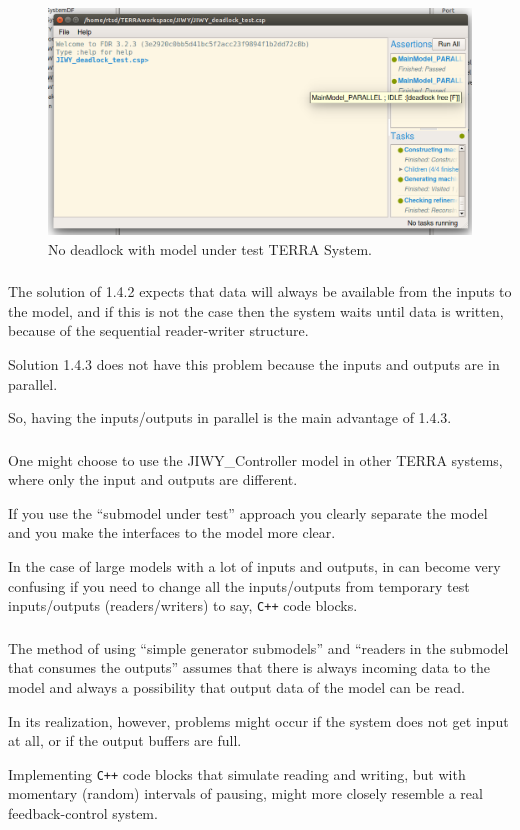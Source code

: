 \documentclass[a4paper,twoside,11pt]{article}
\newcommand{\cpp}{{\tt C++} }
\begin{document}
\begin{figure}
	\centering
	\includegraphics[width=\textwidth]{./images/4-4_fdr.png}
	\caption{No deadlock with model under test TERRA System.}
	\label{fig:4_4_fdr}
\end{figure}

\subsubsection{}
The solution of 1.4.2 expects that data will always be available from the inputs 
to the model, and if this is not the case then the system waits until data is written, 
because of the sequential reader-writer structure.

Solution 1.4.3 does not have this problem because the inputs and outputs are in parallel.

So, having the inputs/outputs in parallel is the main advantage of 1.4.3.

\subsubsection{}
One might choose to use the JIWY\_Controller model in other TERRA systems, where only the input and outputs are different.

If you use the ``submodel under test'' approach you clearly separate the model and you make the interfaces to the model more clear.

In the case of large models with a lot of inputs and outputs, in can become very confusing if you need to change all the inputs/outputs from temporary test inputs/outputs (readers/writers) to say, \cpp code blocks.

\subsubsection{}
The method of using ``simple generator submodels'' and ``readers in the submodel 
that consumes the outputs'' assumes that there is always incoming data to the model and always a possibility that output data of the model can be read.

In its realization, however, problems might occur if the system does not get input at all, or if the output buffers are full.

Implementing \cpp code blocks that simulate reading and writing,
but with momentary (random) intervals of pausing, might more closely resemble a real feedback-control system.
\end{document}
